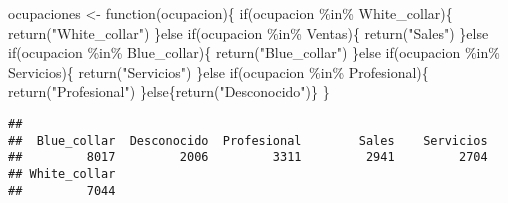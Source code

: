 \documentclass[]{article}
\newenvironment{Shaded}{\begin{snugshade}}{\end{snugshade}}
\newcommand{\ControlFlowTok}[1]{\textcolor[rgb]{0.94,0.87,0.69}{#1}}
\newcommand{\KeywordTok}[1]{\textcolor[rgb]{0.94,0.87,0.69}{#1}}
\newcommand{\NormalTok}[1]{\textcolor[rgb]{0.80,0.80,0.80}{#1}}
\newcommand{\OperatorTok}[1]{\textcolor[rgb]{0.94,0.94,0.82}{#1}}
\newcommand{\StringTok}[1]{\textcolor[rgb]{0.80,0.58,0.58}{#1}}
\begin{document}
\begin{Shaded}
\begin{Highlighting}[]
\NormalTok{ocupaciones \textless{}{-}}\StringTok{ }\ControlFlowTok{function}\NormalTok{(ocupacion)\{}
  \ControlFlowTok{if}\NormalTok{(ocupacion }\OperatorTok{\%in\%}\StringTok{ }\NormalTok{White\_collar)\{}
    \KeywordTok{return}\NormalTok{(}\StringTok{"White\_collar"}\NormalTok{)}
\NormalTok{  \}}\ControlFlowTok{else} \ControlFlowTok{if}\NormalTok{(ocupacion }\OperatorTok{\%in\%}\StringTok{ }\NormalTok{Ventas)\{}
    \KeywordTok{return}\NormalTok{(}\StringTok{"Sales"}\NormalTok{)}
\NormalTok{  \}}\ControlFlowTok{else} \ControlFlowTok{if}\NormalTok{(ocupacion }\OperatorTok{\%in\%}\StringTok{ }\NormalTok{Blue\_collar)\{}
    \KeywordTok{return}\NormalTok{(}\StringTok{"Blue\_collar"}\NormalTok{)}
\NormalTok{  \}}\ControlFlowTok{else} \ControlFlowTok{if}\NormalTok{(ocupacion }\OperatorTok{\%in\%}\StringTok{ }\NormalTok{Servicios)\{}
    \KeywordTok{return}\NormalTok{(}\StringTok{"Servicios"}\NormalTok{)}
\NormalTok{  \}}\ControlFlowTok{else} \ControlFlowTok{if}\NormalTok{(ocupacion }\OperatorTok{\%in\%}\StringTok{ }\NormalTok{Profesional)\{}
    \KeywordTok{return}\NormalTok{(}\StringTok{"Profesional"}\NormalTok{)}
\NormalTok{  \}}\ControlFlowTok{else}\NormalTok{\{}\KeywordTok{return}\NormalTok{(}\StringTok{"Desconocido"}\NormalTok{)\}}
\NormalTok{\}}
\end{Highlighting}
\end{Shaded}

\begin{Shaded}
\end{Shaded}

\begin{Shaded}
\end{Shaded}

\begin{verbatim}
## 
##  Blue_collar  Desconocido  Profesional        Sales    Servicios 
##         8017         2006         3311         2941         2704 
## White_collar 
##         7044
\end{verbatim}
\end{document}
